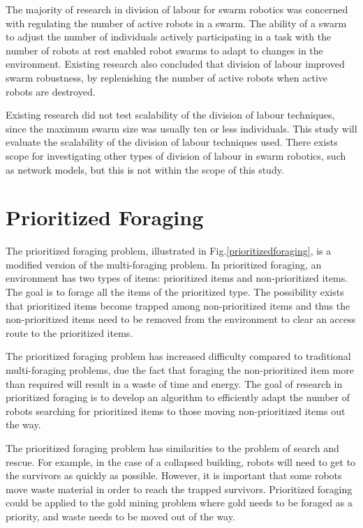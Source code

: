 \documentclass[preprint,12pt]{elsarticle}
\begin{document}
The majority of research in division of labour for swarm robotics was concerned with regulating the number of active robots in a swarm. The ability of a swarm to adjust the number of individuals actively participating in a task with the number of robots at rest enabled robot swarms to adapt to changes in the environment. Existing research also concluded that division of labour improved swarm robustness, by replenishing the number of active robots when active robots are destroyed. 

Existing research did not test scalability of the division of labour techniques, since the maximum swarm size was usually ten or less individuals. This study will evaluate the scalability of the division of labour techniques used. There exists scope for investigating other types of division of labour in swarm robotics, such as network models, but this is not within the scope of this study. 



\section{Prioritized Foraging}
\label{Prioritized Foraging}

The prioritized foraging problem, illustrated in Fig.\ref{prioritizedforaging}, is a modified version of the multi-foraging problem. In prioritized foraging, an environment has two types of items: prioritized items and non-prioritized items. The goal is to forage all the items of the prioritized type. The possibility exists that prioritized items become trapped among non-prioritized items and thus the non-prioritized items need to be removed from the environment to clear an access route to the prioritized items. 


The prioritized foraging problem has increased difficulty compared to traditional multi-foraging problems, due the fact that foraging the non-prioritized item more than required will result in a waste of time and energy. The goal of research in prioritized foraging is to develop an algorithm to efficiently adapt the number of robots searching for prioritized items to those moving non-prioritized items out the way. 


The prioritized foraging problem has similarities to the problem of search and rescue. For example, in the case of a collapsed building, robots will need to get to the survivors as quickly as possible. However, it is important that some robots move waste material in order to reach the trapped survivors. Prioritized foraging could be applied to the gold mining problem where gold needs to be foraged as a priority, and waste needs to be moved out of the way.
\end{document}
